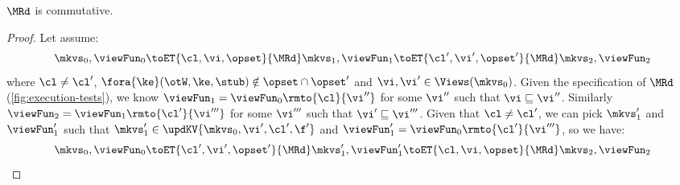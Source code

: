 \begin{lemma}
    \label{lem:mr-comm}
    \(\MRd\) is commutative.
\end{lemma}
\begin{proof}
    Let assume:
    \[
        \mkvs_0, \viewFun_0 \toET{\cl, \vi, \opset}{\MRd} \mkvs_1, \viewFun_1 \toET{\cl', \vi', \opset'}{\MRd} \mkvs_2, \viewFun_2 
    \]
    where \( \cl \neq \cl' \), \( \fora{ \ke } (\otW, \ke, \stub) \notin \opset \cap \opset' \) and \( \vi, \vi' \in \Views(\mkvs_0)\).
    Given the specification of \(\MRd\) (\cref{fig:execution-tests}), we know \( \viewFun_1 = \viewFun_0\rmto{\cl}{\vi''}\) for some \( \vi'' \) such that \( \vi \sqsubseteq \vi'' \).
    Similarly \( \viewFun_2 = \viewFun_1\rmto{\cl'}{\vi'''} \) for some \( \vi''' \) such that \(  \vi' \sqsubseteq \vi''' \). 
    Given that \( \cl \neq \cl' \), we can pick \( \mkvs'_1 \) and \( \viewFun'_1 \) such that \( \mkvs'_1 \in \updKV{\mkvs_0,\vi',\cl',\f'} \) and \( \viewFun'_1 = \viewFun_0\rmto{\cl'}{\vi'''} \), so we have:
    \[
        \mkvs_0, \viewFun_0 \toET{\cl', \vi', \opset'}{\MRd} \mkvs'_1, \viewFun'_1 \toET{\cl, \vi, \opset}{\MRd} \mkvs_2, \viewFun_2 
    \]
\end{proof}                                                                                    

